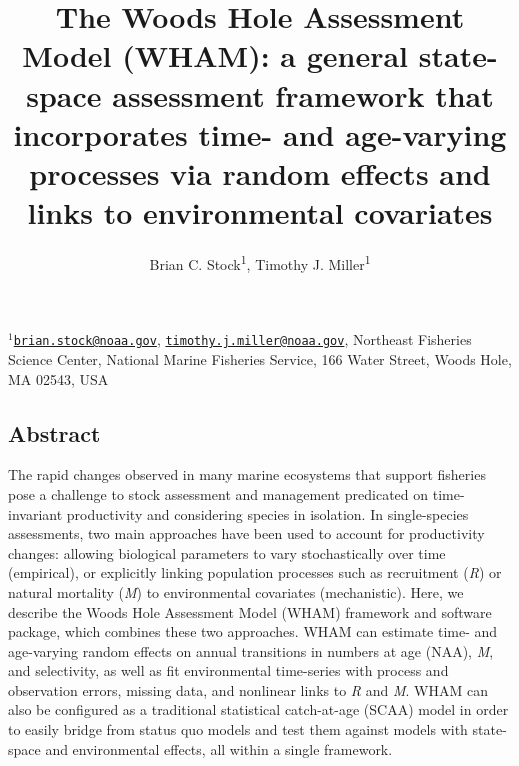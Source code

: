 \documentclass[]{article}
\title{The Woods Hole Assessment Model (WHAM): a general state-space assessment
framework that incorporates time- and age-varying processes via random
effects and links to environmental covariates}
\author{Brian C. Stock\textsuperscript{1}, Timothy J. Miller\textsuperscript{1}}
\date{}
\begin{document}
\maketitle

\(^1\)\href{mailto:brian.stock@noaa.gov}{\nolinkurl{brian.stock@noaa.gov}},
\href{mailto:timothy.j.miller@noaa.gov}{\nolinkurl{timothy.j.miller@noaa.gov}},
Northeast Fisheries Science Center, National Marine Fisheries Service,
166 Water Street, Woods Hole, MA 02543, USA\\

\pagebreak

\hypertarget{abstract}{%
\subsection*{Abstract}\label{abstract}}

The rapid changes observed in many marine ecosystems that support
fisheries pose a challenge to stock assessment and management predicated
on time-invariant productivity and considering species in isolation. In
single-species assessments, two main approaches have been used to
account for productivity changes: allowing biological parameters to vary
stochastically over time (empirical), or explicitly linking population
processes such as recruitment (\emph{R}) or natural mortality (\emph{M})
to environmental covariates (mechanistic). Here, we describe the Woods
Hole Assessment Model (WHAM) framework and software package, which
combines these two approaches. WHAM can estimate time- and age-varying
random effects on annual transitions in numbers at age (NAA), \emph{M},
and selectivity, as well as fit environmental time-series with process
and observation errors, missing data, and nonlinear links to \emph{R}
and \emph{M}. WHAM can also be configured as a traditional statistical
catch-at-age (SCAA) model in order to easily bridge from status quo
models and test them against models with state-space and environmental
effects, all within a single framework.
\end{document}
